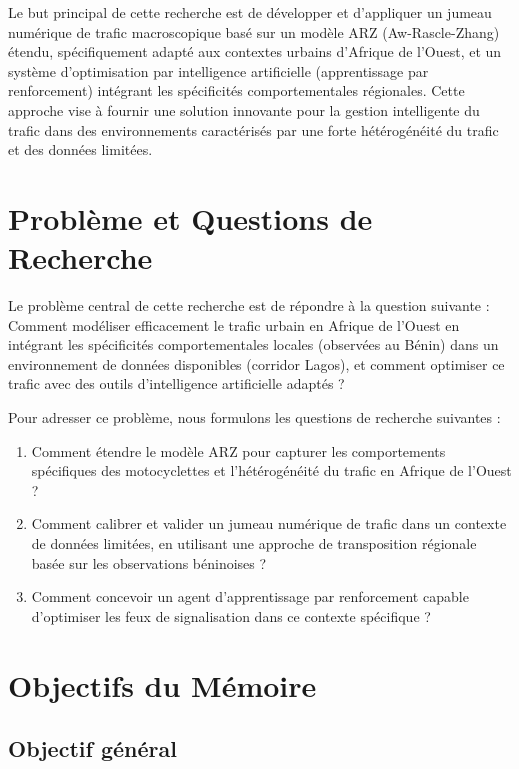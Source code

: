Le but principal de cette recherche est de développer et d'appliquer un jumeau numérique de trafic macroscopique basé sur un modèle ARZ (Aw-Rascle-Zhang) étendu, spécifiquement adapté aux contextes urbains d'Afrique de l'Ouest, et un système d'optimisation par intelligence artificielle (apprentissage par renforcement) intégrant les spécificités comportementales régionales. Cette approche vise à fournir une solution innovante pour la gestion intelligente du trafic dans des environnements caractérisés par une forte hétérogénéité du trafic et des données limitées.

\section{Problème et Questions de Recherche}
\label{sec:probleme_questions}

Le problème central de cette recherche est de répondre à la question suivante : Comment modéliser efficacement le trafic urbain en Afrique de l'Ouest en intégrant les spécificités comportementales locales (observées au Bénin) dans un environnement de données disponibles (corridor Lagos), et comment optimiser ce trafic avec des outils d'intelligence artificielle adaptés ?

Pour adresser ce problème, nous formulons les questions de recherche suivantes :
\begin{enumerate}
    \item Comment étendre le modèle ARZ pour capturer les comportements spécifiques des motocyclettes et l'hétérogénéité du trafic en Afrique de l'Ouest ?
    \item Comment calibrer et valider un jumeau numérique de trafic dans un contexte de données limitées, en utilisant une approche de transposition régionale basée sur les observations béninoises ?
    \item Comment concevoir un agent d'apprentissage par renforcement capable d'optimiser les feux de signalisation dans ce contexte spécifique ?
\end{enumerate}

\section{Objectifs du Mémoire}
\label{sec:objectifs_memoire}

\subsection{Objectif général}
\label{subsec:objectif_general}

